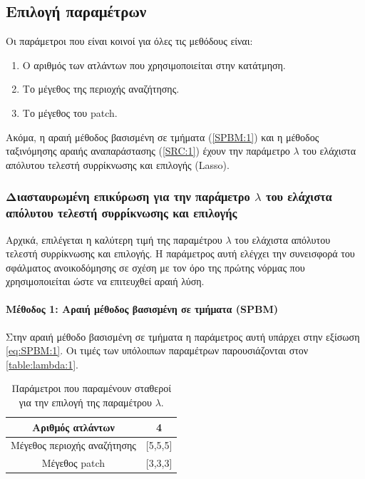 \documentclass[a4paper,12pt]{article}
\newcommand{\paragraphLine}[1]{\paragraph{#1}\mbox{}}
\begin{document}
\subsection{Επιλογή παραμέτρων}

Οι παράμετροι που είναι κοινοί για όλες τις μεθόδους είναι:

\begin{enumerate}
    \item Ο αριθμός των ατλάντων που χρησιμοποιείται στην κατάτμηση.
    \item Το μέγεθος της περιοχής αναζήτησης.
    \item Το μέγεθος του patch.
\end{enumerate}

Ακόμα, η αραιή μέθοδος βασισμένη σε τμήματα (\ref{SPBM:1}) και η μέθοδος
ταξινόμησης αραιής αναπαράστασης (\ref{SRC:1}) έχουν την παράμετρο $\lambda$ του
ελάχιστα απόλυτου τελεστή συρρίκνωσης και επιλογής (Lasso).

\subsubsection{Διασταυρωμένη επικύρωση για την παράμετρο $\lambda$ του ελάχιστα
απόλυτου τελεστή συρρίκνωσης και επιλογής}

Αρχικά, επιλέγεται η καλύτερη τιμή της παραμέτρου $\lambda$ του ελάχιστα
απόλυτου τελεστή συρρίκνωσης και επιλογής. Η παράμετρος αυτή ελέγχει την
συνεισφορά του σφάλματος ανοικοδόμησης σε σχέση με τον όρο της πρώτης νόρμας που
χρησιμοποιείται ώστε να επιτευχθεί αραιή λύση.

\paragraphLine{Μέθοδος 1: Αραιή μέθοδος βασισμένη σε τμήματα (SPBM)}

Στην αραιή μέθοδο βασισμένη σε τμήματα η παράμετρος αυτή υπάρχει στην εξίσωση
\eqref{eq:SPBM:1}. Οι τιμές των υπόλοιπων παραμέτρων παρουσιάζονται στον
\autoref{table:lambda:1}.

\begin{table}[h!]
    \centering
    \begin{tabular}{|c|c|} 
        \hline
        Αριθμός ατλάντων & 4 \\ 
        \hline
        Μέγεθος περιοχής αναζήτησης & [5,5,5] \\ 
        \hline
        Μέγεθος patch & [3,3,3] \\ 
        \hline
    \end{tabular}
    \caption{Παράμετροι που παραμένουν σταθεροί για την επιλογή της παραμέτρου
             $\lambda$.}
    \label{table:lambda:1}
\end{table}
\end{document}
